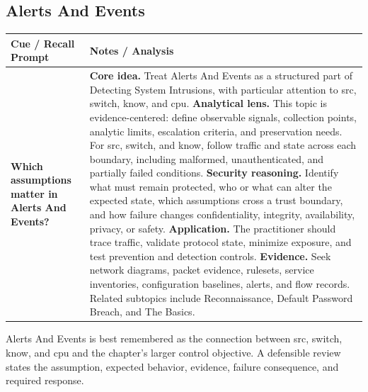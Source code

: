\documentclass[11pt]{article}
\newcommand{\CornellHeader}{%
\rowcolor{Navy}\color{white}\bfseries Cue / Recall Prompt & \color{white}\bfseries Notes / Analysis\\\hline}
\newcommand{\CornellRow}[2]{%
\cellcolor{CueGray}\RaggedRight\textbf{#1} & \RaggedRight #2\\\hline}
\begin{document}
\subsection*{Alerts And Events}
\begin{longtable}{>{\RaggedRight\arraybackslash}p{}|>{\RaggedRight\arraybackslash}p{}}
\CornellHeader
\CornellRow{Which assumptions matter in Alerts And Events?}{\textbf{Core idea.} Treat Alerts And Events as a structured part of Detecting System Intrusions, with particular attention to src, switch, know, and cpu. \textbf{Analytical lens.} This topic is evidence-centered: define observable signals, collection points, analytic limits, escalation criteria, and preservation needs. For src, switch, and know, follow traffic and state across each boundary, including malformed, unauthenticated, and partially failed conditions. \textbf{Security reasoning.} Identify what must remain protected, who or what can alter the expected state, which assumptions cross a trust boundary, and how failure changes confidentiality, integrity, availability, privacy, or safety. \textbf{Application.} The practitioner should trace traffic, validate protocol state, minimize exposure, and test prevention and detection controls. \textbf{Evidence.} Seek network diagrams, packet evidence, rulesets, service inventories, configuration baselines, alerts, and flow records. Related subtopics include Reconnaissance, Default Password Breach, and The Basics.}
\end{longtable}
\begin{topicsummary}
Alerts And Events is best remembered as the connection between src, switch, know, and cpu and the chapter's larger control objective. A defensible review states the assumption, expected behavior, evidence, failure consequence, and required response.
\end{topicsummary}
\end{document}

